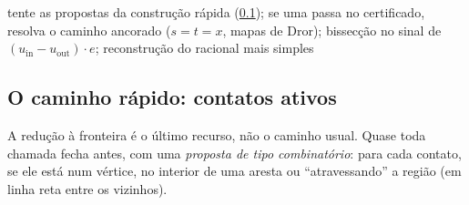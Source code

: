 \documentclass[11pt,a4paper]{article}
\theoremstyle{plain}\newtheorem{proposicao}{Proposição}
\theoremstyle{definition}\newtheorem{definicao}{Definição}
\theoremstyle{plain}\newtheorem{teorema}{Teorema}
\theoremstyle{plain}\newtheorem{lema}{Lema}
\begin{document}
\begin{algorithm}[ht]\small
\caption{Redução à fronteira (fluxo exato; esquema).}\label{alg:fronteira}
\begin{algorithmic}[1]
  \State tente as propostas da construção rápida (\cref{sec:rapida}); se uma passa no certificado, \Return
      \State resolva o caminho ancorado ($s=t=x$, mapas de Dror); 
    \EndFor
    \State bissecção no sinal de $(u_{\text{in}}-u_{\text{out}})\cdot e$; reconstrução do racional mais simples
  \EndFor
\EndFunction
\end{algorithmic}
\end{algorithm}

\subsection{O caminho rápido: contatos ativos}\label{sec:rapida}
A redução à fronteira é o último recurso, não o caminho usual. Quase toda chamada fecha antes, com uma \emph{proposta de tipo combinatório}: para cada contato, se ele está num vértice, no interior de uma aresta ou ``atravessando'' a região (em linha reta entre os vizinhos).
\end{document}

